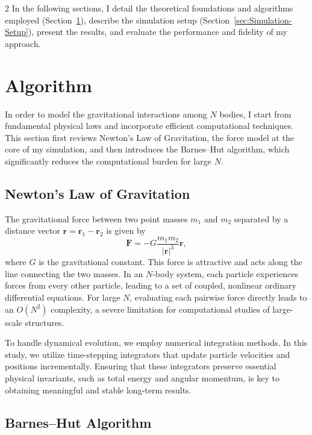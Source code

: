 \documentclass[a4paper, 12pt, oneside, onecolumn]{article}
\begin{document}
\begin{multicols}{2}
In the following sections, I detail the theoretical foundations and algorithms employed (Section~\ref{sec:algorithm}), describe the simulation setup (Section~\ref{sec:Simulation-Setup}), present the results, and evaluate the performance and fidelity of my approach.


\section{Algorithm}\label{sec:algorithm}

In order to model the gravitational interactions among $N$ bodies, I start from fundamental physical laws and incorporate efficient computational techniques. This section first reviews Newton’s Law of Gravitation, the force model at the core of my simulation, and then introduces the Barnes–Hut algorithm, which significantly reduces the computational burden for large $N$.

\subsection{Newton’s Law of Gravitation}

The gravitational force between two point masses $m_1$ and $m_2$ separated by a distance vector $\mathbf{r} = \mathbf{r}_1 - \mathbf{r}_2$ is given by
\begin{equation}
\mathbf{F} = -G \frac{m_1 m_2}{|\mathbf{r}|^3} \mathbf{r},
\end{equation}
where $G$ is the gravitational constant. This force is attractive and acts along the line connecting the two masses. In an $N$-body system, each particle experiences forces from every other particle, leading to a set of coupled, nonlinear ordinary differential equations. For large $N$, evaluating each pairwise force directly leads to an $O(N^2)$ complexity, a severe limitation for computational studies of large-scale structures.

To handle dynamical evolution, we employ numerical integration methods. In this study, we utilize time-stepping integrators that update particle velocities and positions incrementally. Ensuring that these integrators preserve essential physical invariants, such as total energy and angular momentum, is key to obtaining meaningful and stable long-term results.

\subsection{Barnes–Hut Algorithm\cite{barnes_hierarchical_1986}}


\end{multicols}
\end{document}
